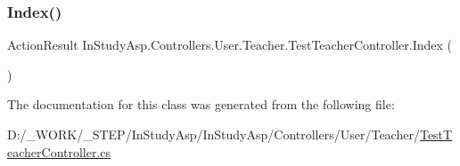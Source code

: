 \subsubsection{\texorpdfstring{Index()}{Index()}}
{\footnotesize\ttfamily Action\+Result In\+Study\+Asp.\+Controllers.\+User.\+Teacher.\+Test\+Teacher\+Controller.\+Index (\begin{DoxyParamCaption}{ }\end{DoxyParamCaption})}



The documentation for this class was generated from the following file\+:\begin{DoxyCompactItemize}
\item 
D\+:/\+\_\+\+W\+O\+R\+K/\+\_\+\+S\+T\+E\+P/\+In\+Study\+Asp/\+In\+Study\+Asp/\+Controllers/\+User/\+Teacher/\hyperlink{_test_teacher_controller_8cs}{Test\+Teacher\+Controller.\+cs}\end{DoxyCompactItemize}
